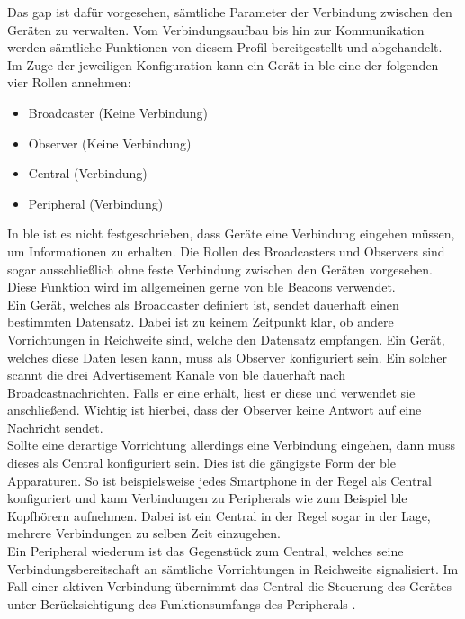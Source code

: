 \noindent Das \ac{gap} ist dafür vorgesehen, sämtliche Parameter der Verbindung zwischen den Geräten zu verwalten. Vom Verbindungsaufbau bis hin zur Kommunikation werden sämtliche Funktionen von diesem Profil bereitgestellt und abgehandelt.\\
\noindent Im Zuge der jeweiligen Konfiguration kann ein Gerät in \ac{ble} eine der folgenden vier Rollen annehmen:
\begin{itemize}
	\setlength{\itemsep}{1pt}
	\item{Broadcaster (Keine Verbindung)}
	\item{Observer (Keine Verbindung)}
	\item{Central (Verbindung)}
	\item{Peripheral (Verbindung)}
\end{itemize}   
\noindent In \ac{ble} ist es nicht festgeschrieben, dass Geräte eine Verbindung eingehen müssen, um Informationen zu erhalten. Die Rollen des Broadcasters und Observers sind sogar ausschließlich ohne feste Verbindung zwischen den Geräten vorgesehen. Diese Funktion wird im allgemeinen gerne von \ac{ble} Beacons verwendet.\\
\noindent Ein Gerät, welches als Broadcaster definiert ist, sendet dauerhaft einen bestimmten Datensatz. Dabei ist zu keinem Zeitpunkt klar, ob andere Vorrichtungen in Reichweite sind, welche den Datensatz empfangen. Ein Gerät, welches diese Daten lesen kann, muss als Observer konfiguriert sein. Ein solcher scannt die drei Advertisement Kanäle von \ac{ble} dauerhaft nach Broadcastnachrichten. Falls er eine erhält, liest er diese und verwendet sie anschließend. Wichtig ist hierbei, dass der Observer keine Antwort auf eine Nachricht sendet.\\  
\noindent Sollte eine derartige Vorrichtung allerdings eine Verbindung eingehen, dann muss dieses als Central konfiguriert sein. Dies ist die gängigste Form der \ac{ble} Apparaturen. So ist beispielsweise jedes Smartphone in der Regel als Central konfiguriert und kann Verbindungen zu Peripherals wie zum Beispiel \ac{ble} Kopfhörern aufnehmen. Dabei ist ein Central in der Regel sogar in der Lage, mehrere Verbindungen zu selben Zeit einzugehen.\\
\noindent Ein Peripheral wiederum ist das Gegenstück zum Central, welches seine Verbindungsbereitschaft an sämtliche Vorrichtungen in Reichweite signalisiert. Im Fall einer aktiven Verbindung übernimmt das Central die Steuerung des Gerätes unter Berücksichtigung des Funktionsumfangs des Peripherals \cite[Seite 34]{Usama17:BBS}.\\
